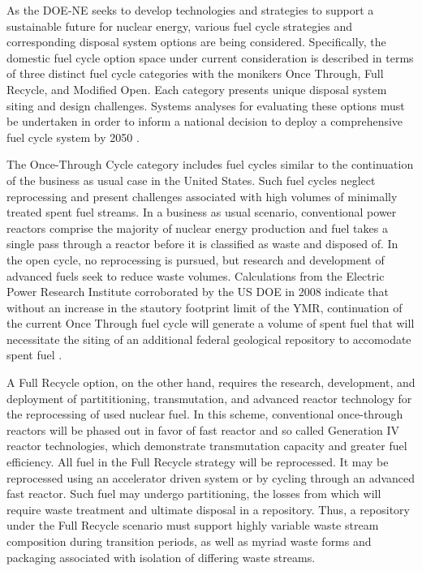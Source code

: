 As the DOE-NE seeks to develop technologies and strategies to support a 
sustainable future for nuclear energy, various fuel cycle strategies and 
corresponding disposal system options are being considered.  Specifically, the 
domestic fuel cycle option space under current consideration is described in 
terms of three distinct fuel cycle categories with the monikers Once Through, 
Full Recycle, and Modified Open. Each category presents unique disposal system 
siting and design challenges. Systems analyses for evaluating these options must 
be undertaken in order to inform a national decision to deploy a comprehensive 
fuel cycle system by 2050 \cite{doe_nuclear_2010}. 


The Once-Through Cycle category includes fuel cycles similar to the continuation 
of the business as usual case in the United States.
Such fuel cycles neglect reprocessing and present challenges associated with 
high volumes of minimally treated spent fuel streams.  In a business as usual 
scenario, conventional power reactors comprise the majority of nuclear energy 
production and fuel takes a single pass through a reactor before it is 
classified as waste and disposed of. In the open cycle, no reprocessing is 
pursued, but research and development of advanced fuels seek to reduce waste 
volumes. Calculations from the Electric Power Research Institute corroborated by 
the \gls{US} \gls{DOE} in 2008 indicate that without an increase in the stautory 
footprint limit of the \gls{YMR}, continuation of the current Once Through fuel 
cycle will generate a volume of spent fuel that will necessitate
the siting of an additional federal geological repository to accomodate spent 
fuel \cite{kessler_room_2006, doe_report_2008}. 


A Full Recycle option, on the other hand, requires the research, development, 
and deployment of partititioning, transmutation, and advanced reactor technology 
for the reprocessing of used nuclear fuel.  In this scheme, conventional 
once-through reactors will be phased out in favor of fast reactor and so called 
Generation IV reactor technologies, which demonstrate transmutation capacity and 
greater fuel efficiency. All fuel in the Full Recycle strategy will be 
reprocessed. It may be reprocessed using  an accelerator driven system or by 
cycling through an advanced fast reactor. Such fuel may undergo partitioning, 
the losses from which will require waste treatment and ultimate disposal in a 
repository. Thus, a repository under the Full Recycle scenario must support 
highly variable waste stream composition during transition periods, as well as 
myriad waste forms and packaging associated with isolation of differing waste 
streams.

